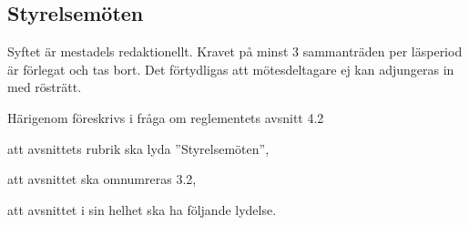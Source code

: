 \documentclass{article}
\begin{document}
\subsection{Styrelsemöten}
Syftet är mestadels redaktionellt. 
Kravet på minst 3 sammanträden per läsperiod är förlegat och tas bort.
Det förtydligas att mötesdeltagare ej kan adjungeras in med rösträtt.

Härigenom föreskrivs i fråga om reglementets avsnitt 4.2

\begin{dels}
    \item att avsnittets rubrik ska lyda ''Styrelsemöten'',
    \item att avsnittet ska omnumreras 3.2,
    \item att avsnittet i sin helhet ska ha följande lydelse.
\end{dels}
\end{document}
